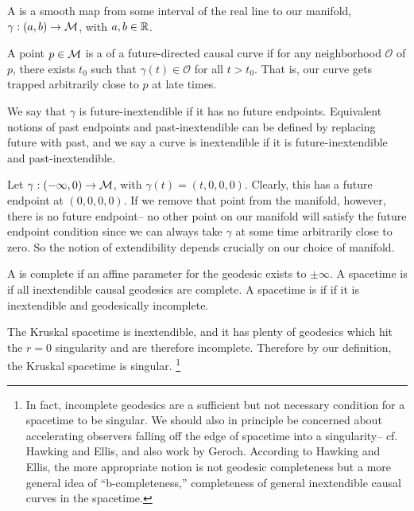 \begin{defn}
    A  is a smooth map from some interval of the real line to our manifold, $\gamma:(a,b) \to \mathcal{M}$, with $a,b\in \mathbb{R}$.
\end{defn}
\begin{defn}
    A point $p\in \mathcal{M}$ is a  of a future-directed causal curve if for any neighborhood $\mathcal{O}$ of $p$, there exists $t_0$ such that $\gamma(t) \in \mathcal{O}$ for all $t>t_0$. That is, our curve gets trapped arbitrarily close to $p$ at late times.
\end{defn}
\begin{defn}
    We say that $\gamma$ is future-inextendible if it has no future endpoints. Equivalent notions of past endpoints and past-inextendible can be defined by replacing future with past, and we say a curve is inextendible if it is future-inextendible and past-inextendible.
\end{defn}
\begin{exm}
    Let $\gamma:(-\infty,0)\to \mathcal{M}$, with $\gamma(t)=(t,0,0,0)$. Clearly, this has a future endpoint at $(0,0,0,0)$. If we remove that point from the manifold, however, there is no future endpoint-- no other point on our manifold will satisfy the future endpoint condition since we can always take $\gamma$ at some time arbitrarily close to zero. So the notion of extendibility depends crucially on our choice of manifold.
\end{exm}
\begin{defn}
    A  is complete if an affine parameter for the geodesic exists to $\pm \infty$. A spacetime is  if all inextendible causal geodesics are complete. A spacetime is  if if it is inextendible and geodesically incomplete.
\end{defn}
\begin{exm}
    The Kruskal spacetime is inextendible, and it has plenty of geodesics which hit the $r=0$ singularity and are therefore incomplete. Therefore by our definition, the Kruskal spacetime is singular.%
        \footnote{In fact, incomplete geodesics are a sufficient but not necessary condition for a spacetime to be singular. We should also in principle be concerned about accelerating observers falling off the edge of spacetime into a singularity-- cf. Hawking and Ellis, and also work by Geroch. According to Hawking and Ellis, the more appropriate notion is not geodesic completeness but a more general idea of ``b-completeness,'' completeness of general inextendible causal curves in the spacetime.}
\end{exm}

